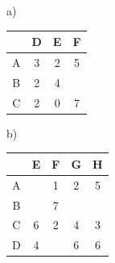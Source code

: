 \vspace{-10pt}\begin{minipage}[t]{0.45\textwidth}
a)\vspace{2pt}

\begin{tabular}{c|ccc}
 & D & E & F \\
\hline
A & 3 & 2 & 5 \\
B & 2 & 4 &   \\
C & 2 & 0 & 7 \\
\end{tabular}
\end{minipage}%
\begin{minipage}[t]{0.45\textwidth}
b)\vspace{2pt}

\begin{tabular}{c|cccc}
 & E & F & G & H \\
\hline
A &   & 1 & 2 & 5 \\
B &   & 7 &   &   \\
C & 6 & 2 & 4 & 3 \\
D & 4 &   & 6 & 6 \\
\end{tabular}
\end{minipage}

